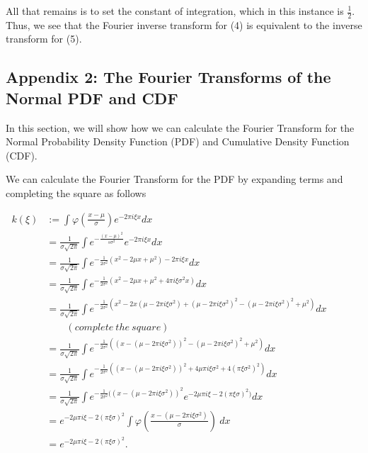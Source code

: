 \documentclass[]{article}
\begin{document}
All that remains is to set the constant of integration, which in this
instance is \(\frac{1}{2}\). Thus, we see that the Fourier inverse
transform for (4) is equivalent to the inverse transform for (5).

\hypertarget{appendix-2-the-fourier-transforms-of-the-normal-pdf-and-cdf}{%
\subsection{Appendix 2: The Fourier Transforms of the Normal PDF and
CDF}\label{appendix-2-the-fourier-transforms-of-the-normal-pdf-and-cdf}}

In this section, we will show how we can calculate the Fourier Transform
for the Normal Probability Density Function (PDF) and Cumulative Density
Function (CDF).

We can calculate the Fourier Transform for the PDF by expanding terms
and completing the square as follows

\begin{align*}
k(\xi) &:= \int \varphi (\frac{x - \mu}{\sigma}) e^{-2 \pi i \xi x} dx \\
&= \frac{1}{\sigma \sqrt{2 \pi}} \int e^{-\frac{(x - \mu)^2}{s \sigma^2}} e^{-2 \pi i \xi x} dx\\
&= \frac{1}{\sigma \sqrt{2 \pi}} \int e^{-\frac{1}{2 \sigma^2}(x^2 - 2 \mu x + \mu^2) - 2 \pi i \xi x} dx\\
&= \frac{1}{\sigma \sqrt{2 \pi}} \int e^{-\frac{1}{2 \sigma^2}(x^2 - 2 \mu x + \mu^2 + 4 \pi i \xi \sigma^2 x)} dx\\
&= \frac{1}{\sigma \sqrt{2 \pi}} \int e^{-\frac{1}{2 \sigma^2}(x^2 - 2x (\mu - 2 \pi i \xi \sigma^2) + (\mu - 2 \pi i \xi \sigma^2)^2 - (\mu - 2 \pi i \xi \sigma^2)^2 + \mu^2)} dx \hspace{3em}\\
&\hspace{2em}(complete\ the\ square)\\
&= \frac{1}{\sigma \sqrt{2 \pi}} \int e^{-\frac{1}{2 \sigma^2}((x - (\mu - 2 \pi i \xi \sigma^2))^2 - (\mu - 2 \pi i \xi \sigma^2)^2 + \mu^2)} dx\\
&= \frac{1}{\sigma \sqrt{2 \pi}} \int e^{-\frac{1}{2 \sigma^2}((x - (\mu - 2 \pi i \xi \sigma^2))^2 + 4 \mu \pi i \xi \sigma^2 + 4(\pi \xi \sigma^2)^2)} dx\\
&= \frac{1}{\sigma \sqrt{2 \pi}} \int e^{-\frac{1}{2 \sigma^2}((x - (\mu - 2 \pi i \xi \sigma^2))^2}e^{-2 \mu \pi i \xi - 2(\pi \xi \sigma)^2)} dx\\
&= e^{-2 \mu \pi i \xi - 2(\pi \xi \sigma)^2} \int \varphi(\frac{x - (\mu - 2 \pi i \xi \sigma^2)}{\sigma})\ dx\\
&= e^{-2 \mu \pi i \xi - 2(\pi \xi \sigma)^2}.
\end{align*}
\end{document}
